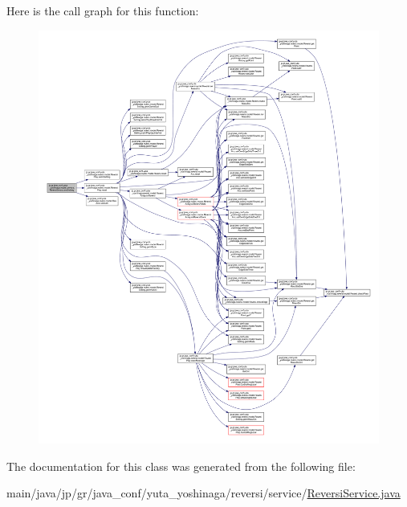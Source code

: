 Here is the call graph for this function\+:
\nopagebreak
\begin{figure}[H]
\begin{center}
\leavevmode
\includegraphics[width=350pt]{classjp_1_1gr_1_1java__conf_1_1yuta__yoshinaga_1_1reversi_1_1service_1_1_reversi_service_a58b49b782275a456cd4ae6ed332446e3_cgraph}
\end{center}
\end{figure}


The documentation for this class was generated from the following file\+:\begin{DoxyCompactItemize}
\item 
main/java/jp/gr/java\+\_\+conf/yuta\+\_\+yoshinaga/reversi/service/\hyperlink{_reversi_service_8java}{Reversi\+Service.\+java}\end{DoxyCompactItemize}
